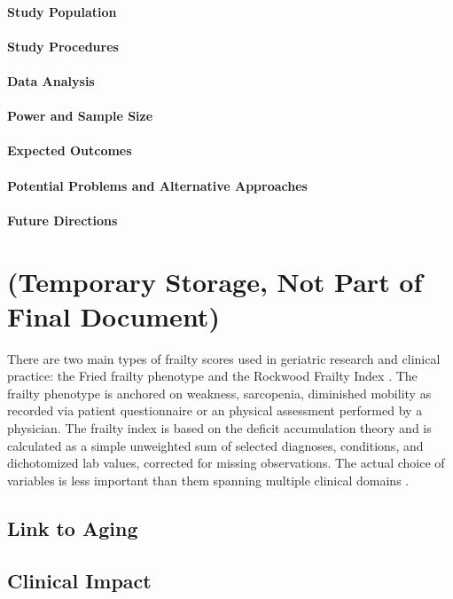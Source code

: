 \paragraph{Study Population}\label{study-population}


\paragraph{Study Procedures}\label{study-procedures}


\paragraph{Data Analysis}\label{data-analysis}

\paragraph{Power and Sample Size}\label{power-and-sample-size}

\paragraph{Expected Outcomes}\label{expected-outcomes}

\paragraph{Potential Problems and Alternative
      Approaches}\label{potential-problems-and-alternative-approaches}

\paragraph{Future Directions}\label{future-directions} 
    
\section{(Temporary Storage, Not Part of Final Document)}\label{ammo}
There are two main types of frailty scores used in geriatric research and clinical practice: the Fried frailty phenotype \cite{Fried_2001} and the Rockwood Frailty Index \cite{Mitnitski_2001}. The frailty phenotype is anchored on weakness, sarcopenia, diminished mobility as recorded via patient questionnaire or an physical assessment performed by a physician. The frailty index is based on the deficit accumulation theory and is calculated as a simple unweighted sum of selected diagnoses, conditions, and dichotomized lab values, corrected for missing observations. The actual choice of variables is less important than them spanning multiple clinical domains \cite{Searle_2008}. 

\subsection{Link to Aging}\label{link-to-aging}

\subsection{Clinical Impact}\label{clinical-impact}



